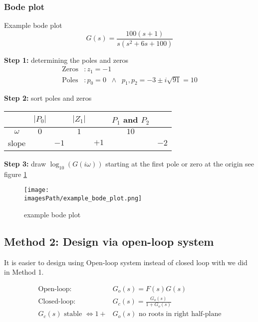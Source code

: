 \subsubsection{Bode plot}
\begin{exampleblock}{Example bode plot}
    \begin{equation*}
        G(s) = \frac{100(s+1)}{s(s^2 + 6s + 100)}
    \end{equation*}

    \textbf{Step 1:} determining the poles and zeros
    \begin{align*}
        \text{Zeros}&: z_1 = -1 \\
        \text{Poles}&: p_0 = 0 \;\; \land \;\; p_1,p_2 = -3\pm i\sqrt{91} = 10
    \end{align*}

    \textbf{Step 2:} sort poles and zeros
    \begin{center}
    \begin{tabular}{ c | c c c c c c } 
      & $|P_0|$ & & $|Z_1|$ & & $P_1$ and $P_2$ & \\ 
     \hline
     $\omega$ & $0$ & & $1$ & & $10$ & \\ 
     slope & & $-1$ & &  $+1$ & & $-2$ \\ 
    \end{tabular}
    \end{center}

    \textbf{Step 3:} draw $\log_{10}(G(i\omega))$ starting at the first pole or zero at the origin
    see figure \ref{fig:example_bode_pot}    
\end{exampleblock}
\begin{figure}[!h]
    \centering
    \texttt{[image: \\imagesPath/example\_bode\_plot.png]}
    \caption{example bode plot}
    \label{fig:example_bode_pot}
\end{figure}

\subsection{Method 2: Design via open-loop system}
It is easier to design using Open-loop system instead of closed loop with we did in Method 1.

\begin{align*}
    \text{Open-loop: }  &G_o(s) = F(s)G(s) \\
    \text{Closed-loop: }  &G_c(s) = \frac{G_o(s)}{1+G_o(s)} \\
    G_c(s) \text{ stable } \Leftrightarrow 1+&G_o(s) \text{ no roots in right half-plane}
\end{align*}

